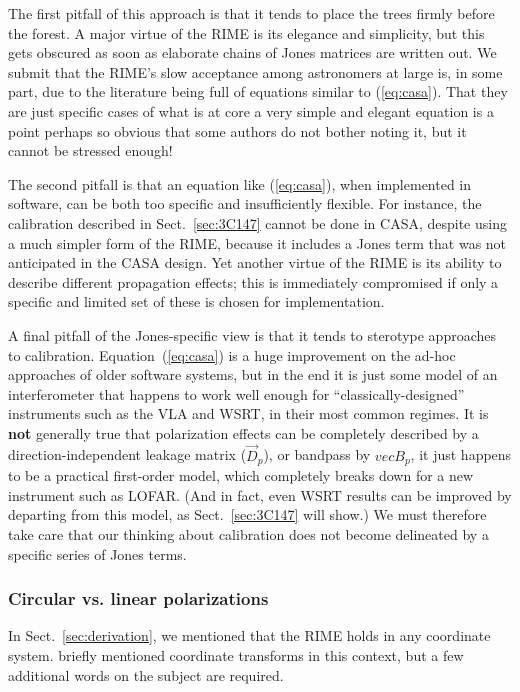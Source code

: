 \documentclass[]{aa}
\newcommand{\jones}[2]{\vec {#1}_{#2}}
\begin{document}
The first pitfall of this approach is that it tends to place the trees firmly before the forest. A major virtue of the RIME is its elegance and simplicity, but this gets obscured as soon as elaborate chains of Jones matrices are written out.  We submit that the RIME's slow acceptance among astronomers at large is, in some part, due to the literature being full of equations similar to (\ref{eq:casa}). That they are just specific cases of what is at core a very simple and elegant equation is a point perhaps so obvious that some authors do not bother noting it, but it cannot be stressed enough!

The second pitfall is that an equation like (\ref{eq:casa}), when implemented in software, can be both too specific and insufficiently flexible. For instance, the calibration described in Sect.~\ref{sec:3C147} cannot be done in CASA, despite using a much simpler form of the RIME, because it includes a Jones term that was not anticipated in the CASA design. Yet another virtue of the RIME is its ability to describe different propagation effects; this is immediately compromised if only a specific and limited set of these is chosen for implementation.

A final pitfall of the Jones-specific view is that it tends to sterotype approaches to calibration. Equation~(\ref{eq:casa}) is a huge improvement on the ad-hoc approaches of older software systems, but in the end it is just some model of an interferometer that happens to work well enough for ``classically-designed'' instruments such as the VLA and WSRT, in their most common regimes. It is {\bf not} generally true that polarization effects can be completely described by a direction-independent leakage matrix ($\jones{D}{p}$), or bandpass by $vec B_p$, it just happens to be a practical first-order model, which completely breaks down for a new instrument such as LOFAR. (And in fact, even WSRT results can be improved by departing from this model, as Sect.~\ref{sec:3C147} will show.) We must therefore take care that our thinking 
about calibration does not become delineated by a specific series of Jones terms.

\subsubsection{\label{sec:circular}Circular vs. linear polarizations}

In Sect.~\ref{sec:derivation}, we mentioned that the RIME holds in any coordinate system. \citet{ME1} briefly mentioned coordinate transforms in this context, but a few additional words on the subject are required.
\end{document}
